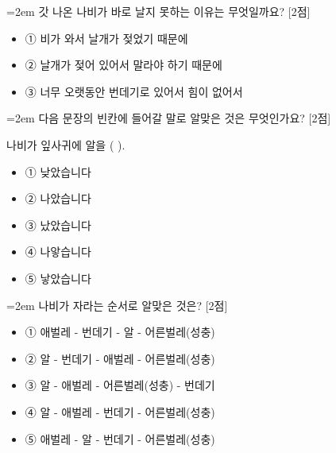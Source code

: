 \documentclass[12pt,a4paper]{article}
\newcommand{\qnum}[1]{%
  \tikz[baseline=(num.base)]{%
    \node[circle, fill=numCircle, text=white, inner sep=0pt,
          minimum size=18pt, font=\small\bfseries] (num) {#1};%
  }%
}
\newcommand{\pts}[1]{%
  \hfill\textcolor{ptsBadge}{[#1점]}%
}
\begin{document}
\vspace{4mm}
\begin{samepage}
{\hangindent=2em
\qnum{18}\enspace 갓 나온 나비가 바로 날지 못하는 이유는 무엇일까요? \pts{2}
\par}

\vspace{3mm}
\begin{itemize}[leftmargin=2.5em, labelsep=0.3em, label={}, itemsep=4pt, parsep=1pt, topsep=0pt]
  \item ① 비가 와서 날개가 젖었기 때문에
  \item ② 날개가 젖어 있어서 말라야 하기 때문에
  \item ③ 너무 오랫동안 번데기로 있어서 힘이 없어서
\end{itemize}
\end{samepage}

\vspace{4mm}
\begin{samepage}
{\hangindent=2em
\qnum{19}\enspace 다음 문장의 빈칸에 들어갈 말로 알맞은 것은 무엇인가요? \pts{2}
\par}

\vspace{3mm}
\begin{tcolorbox}[bogi]
나비가 잎사귀에 알을 (          ).
\end{tcolorbox}
\vspace{3mm}
\begin{itemize}[leftmargin=2.5em, labelsep=0.3em, label={}, itemsep=4pt, parsep=1pt, topsep=0pt]
  \item ① 낮았습니다
  \item ② 나았습니다
  \item ③ 났았습니다
  \item ④ 나앟습니다
  \item ⑤ 낳았습니다
\end{itemize}
\end{samepage}

\vspace{4mm}
\begin{samepage}
{\hangindent=2em
\qnum{20}\enspace 나비가 자라는 순서로 알맞은 것은? \pts{2}
\par}

\vspace{3mm}
\begin{itemize}[leftmargin=2.5em, labelsep=0.3em, label={}, itemsep=4pt, parsep=1pt, topsep=0pt]
  \item ① 애벌레 - 번데기 - 알 - 어른벌레(성충)
  \item ② 알 - 번데기 - 애벌레 - 어른벌레(성충)
  \item ③ 알 - 애벌레 - 어른벌레(성충) - 번데기
  \item ④ 알 - 애벌레 - 번데기 - 어른벌레(성충)
  \item ⑤ 애벌레 - 알 - 번데기 - 어른벌레(성충)
\end{itemize}
\end{samepage}
\end{document}
